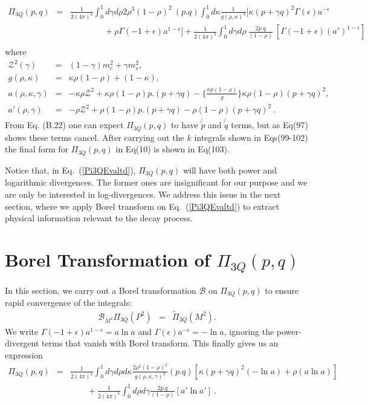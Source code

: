 \documentclass[twoside]{article}
\begin{document}
\begin{eqnarray}
\label{Pi3QEvaltd}
\Pi_{3Q}(p,q)
&=&
\frac{1}{2(4 \pi)^4}
\int_0^1 d \gamma d \rho 2 \rho^3 (1 - \rho)^2~(p.q) \int_0^1 d \kappa 
\frac{1}{g(\rho, \kappa)^3}\Big[
\kappa (p+ \gamma q)^2 \Gamma(\epsilon) a^{-\epsilon} \nonumber\\&&
\qquad \qquad + \rho \Gamma(-1 + \epsilon)a^{1 - \epsilon}\Big]
+ \frac{1}{2(4 \pi)^4} \int_0^1 d \gamma d \rho~ \frac{2p.q}{(1- \rho)}~ 
\left[ \Gamma(-1 + \epsilon)(a')^{1 - \epsilon} \right] \nonumber\\
\end{eqnarray}
where
\begin{eqnarray}
{\mathcal{Z}}^2(\gamma) &=& (1 - \gamma)m_c^2 + \gamma m_s^2, \\
g(\rho, \kappa) &=&\kappa \rho(1 - \rho)+ (1 - \kappa), \\
a(\rho, \kappa, \gamma) &=& - \kappa \rho {\mathcal{Z}}^2 + \kappa \rho 
(1 - \rho) p.(p+ \gamma q) - \Big\{ \frac{\kappa \rho (1 - \rho)}{g} \Big\} 
\kappa \rho (1 - \rho) (p+ \gamma q)^2, \\
a'(\rho, \gamma) &=& - \rho {\mathcal{Z}}^2 + \rho (1 - \rho) 
p.(p+ \gamma q) - \rho (1 - \rho) (p + \gamma q)^2 ~.
\end{eqnarray}
From Eq. (B.22) one can expect $\Pi_{3Q}(p,q)$ to have $\not{p}$ and
$\not{q}$ terms, but as Eq(97) shows these terms cancel. After carrying out
the $k$ integrals shown in Eqs(99-102) the final form for $\Pi_{3Q}(p,q)$ in
Eq(10) is shown in Eq(103).

Notice that, in Eq.~(\ref{Pi3QEvaltd}), $\Pi_{3Q}(p,q)$ will have both power and
 logarithmic divergences. The former ones are insignificant for our purpose and
 we are only be interested in log-divergences. We address this issue in
 the next section, where we apply Borel transform on Eq.~(\ref{Pi3QEvaltd}) to 
extract physical information relevant to the decay process.




\section{Borel Transformation of $\Pi_{3Q}(p,q)$}
In this section, we carry out a Borel transformation $\mathcal{B}$ on 
$\Pi_{3Q}(p,q)$ to ensure rapid convergence of the integrals: 
\begin{eqnarray}
{\mathcal{B}}_{M^2} \Pi_{3Q} (P^2)
&=&
\tilde{\Pi}_{3Q}(M^2).
\end{eqnarray}
We write $\Gamma(-1 + \epsilon) a^{1 - \epsilon} = a \ln a$ and $\Gamma(\epsilon) 
a^{- \epsilon} = - \ln a$, ignoring the power-divergent terms that vanish with 
Borel transform. This finally gives us an expression
\begin{eqnarray}
\label{Pi3cEvaltd_ZeroOne_Final_redefined}
\Pi_{3Q}(p,q) &=&
\frac{1}{2(4 \pi)^4} \int_0^1 d \gamma d \rho d \kappa \frac{2 \rho^3 
(1 - \rho)^2}{g(\rho, \kappa, \gamma)^3} (p.q) \left[
\kappa (p+ \gamma q)^2 \left( - \ln a \right) + \rho \left( a \ln a \right)
\right] \nonumber\\&& \qquad
+ \frac{1}{2(4 \pi)^4} \int_0^1 d \rho d \gamma \frac{2p.q}{(1 - \rho)} 
\left[ a' \ln a' \right]~.
\end{eqnarray}
\end{document}
